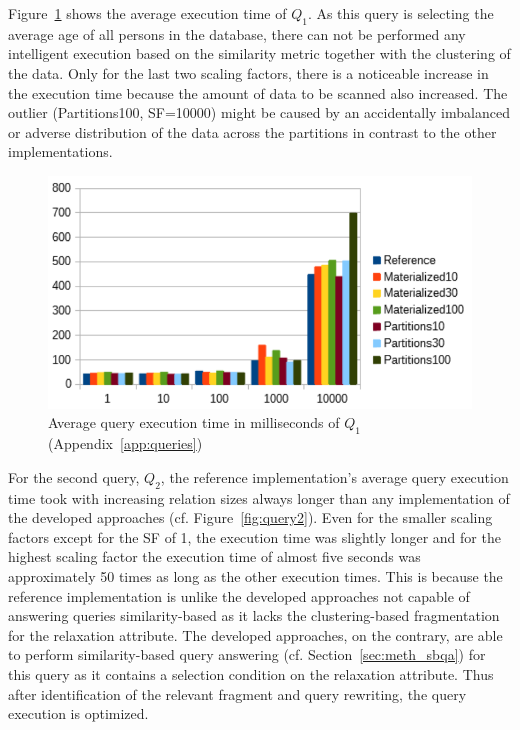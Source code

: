 Figure~\ref{fig:query1} shows the average execution time of $Q_1$. As this query is selecting the average age of all persons in the database, 
there can not be performed any intelligent execution based on the similarity metric together with the clustering of the data. Only for the last two scaling
factors, there is a noticeable increase in the execution time because the amount of data to be scanned also increased. The outlier (Partitions100, SF=10000)
might be caused by an accidentally imbalanced or adverse distribution of the data across the partitions in contrast to the other implementations.
\begin{figure}[h]
    \centering
    \includegraphics[scale=0.8]{charts/Query1.pdf}
    \caption{Average query execution time in milliseconds of $Q_1$ (Appendix~\ref{app:queries})}
    \label{fig:query1}
\end{figure}

For the second query, $Q_2$, the reference implementation's average query execution time took with increasing relation sizes always longer than any
implementation of the developed approaches (cf. Figure~\ref{fig:query2}). Even for the smaller scaling factors except for the SF of 1, the execution time was
slightly longer and for the highest scaling factor the execution time of almost five seconds was approximately 50 times as long as the other execution times.
This is because the reference implementation is unlike the developed approaches not capable of answering queries similarity-based as it lacks the
clustering-based fragmentation for the relaxation attribute. The developed approaches, on the contrary, are able to perform similarity-based query answering 
(cf. Section~\ref{sec:meth_sbqa}) for this query as it contains a selection condition on the relaxation attribute. Thus after identification of the relevant
fragment and query rewriting, the query execution is optimized.

